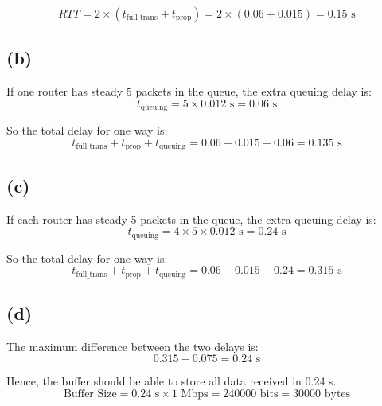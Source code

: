 \documentclass[a4paper,12pt]{article}
\begin{document}
\begin{equation*}
  RTT = 2 \times (t_{\text{full\_trans}} + t_{\text{prop}}) = 2 \times (0.06 + 0.015) = 0.15 \text{ s}
\end{equation*}

\subsection*{(b)}

If one router has steady 5 packets in the queue, the extra queuing delay is:
\begin{equation*}
  t_{\text{queuing}} = 5 \times 0.012 \text{ s} = 0.06 \text{ s}
\end{equation*}

So the total delay for one way is:
\begin{equation*}
  t_{\text{full\_trans}} + t_{\text{prop}} + t_{\text{queuing}} = 0.06 + 0.015 + 0.06 = 0.135 \text{ s}
\end{equation*}

\subsection*{(c)}

If each router has steady 5 packets in the queue, the extra queuing delay is:
\begin{equation*}
  t_{\text{queuing}} = 4 \times 5 \times 0.012 \text{ s} = 0.24 \text{ s}
\end{equation*}

So the total delay for one way is:
\begin{equation*}
  t_{\text{full\_trans}} + t_{\text{prop}} + t_{\text{queuing}} = 0.06 + 0.015 + 0.24 = 0.315 \text{ s}
\end{equation*}

\subsection*{(d)}

The maximum difference between the two delays is:
\begin{equation*}
  0.315 - 0.075 = 0.24 \text{ s}
\end{equation*}

Hence, the buffer should be able to store all data received in 0.24 s.
\begin{equation*}
  \text{Buffer Size} = 0.24 \text{ s} \times 1 \text{ Mbps} = 240000 \text{ bits} = 30000 \text{ bytes}
\end{equation*}
\end{document}
